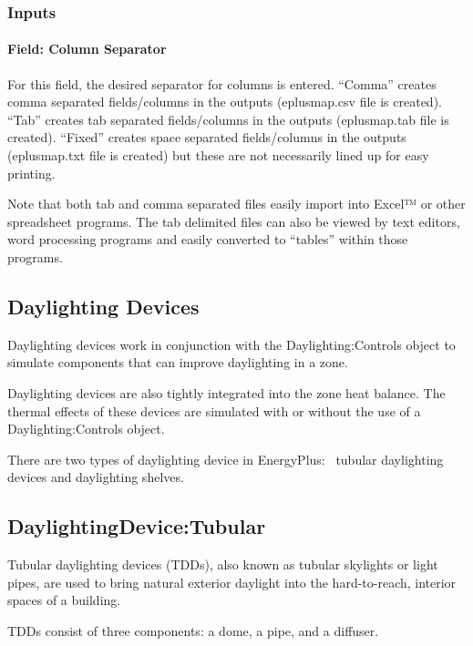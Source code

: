 \subsubsection{Inputs}\label{inputs-5-006}

\paragraph{Field: Column Separator}\label{field-column-separator}

For this field, the desired separator for columns is entered. ``Comma'' creates comma separated fields/columns in the outputs (eplusmap.csv file is created). ``Tab'' creates tab separated fields/columns in the outputs (eplusmap.tab file is created). ``Fixed'' creates space separated fields/columns in the outputs (eplusmap.txt file is created) but these are not necessarily lined up for easy printing.

Note that both tab and comma separated files easily import into Excel™ or other spreadsheet programs. The tab delimited files can also be viewed by text editors, word processing programs and easily converted to ``tables'' within those programs.

\subsection{Daylighting Devices}\label{daylighting-devices}

Daylighting devices work in conjunction with the Daylighting:Controls object to simulate components that can improve daylighting in a zone.

Daylighting devices are also tightly integrated into the zone heat balance. The thermal effects of these devices are simulated with or without the use of a Daylighting:Controls object.

There are two types of daylighting device in EnergyPlus:~ tubular daylighting devices and daylighting shelves.

\subsection{DaylightingDevice:Tubular}\label{daylightingdevicetubular}

Tubular daylighting devices (TDDs), also known as tubular skylights or light pipes, are used to bring natural exterior daylight into the hard-to-reach, interior spaces of a building.

TDDs consist of three components: a dome, a pipe, and a diffuser.

